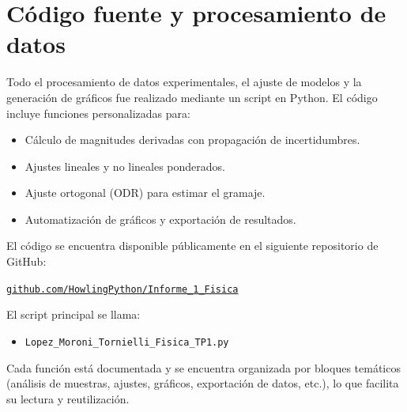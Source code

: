 \documentclass[12pt,a4]{article}
\begin{document}
\appendix
\section{Código fuente y procesamiento de datos}

Todo el procesamiento de datos experimentales, el ajuste de modelos y la generación de gráficos fue realizado mediante un script en Python. El código incluye funciones personalizadas para:

\begin{itemize}
    \item Cálculo de magnitudes derivadas con propagación de incertidumbres.
    \item Ajustes lineales y no lineales ponderados.
    \item Ajuste ortogonal (ODR) para estimar el gramaje.
    \item Automatización de gráficos y exportación de resultados.
\end{itemize}

El código se encuentra disponible públicamente en el siguiente repositorio de GitHub:

\begin{center}
\href{https://github.com/HowlingPython/Informe_1_Fisica.git}{\texttt{github.com/HowlingPython/Informe\_1\_Fisica}}
\end{center}

El script principal se llama:

\begin{itemize}
    \item \texttt{Lopez\_Moroni\_Tornielli\_Fisica\_TP1.py}
\end{itemize}

Cada función está documentada y se encuentra organizada por bloques temáticos (análisis de muestras, ajustes, gráficos, exportación de datos, etc.), lo que facilita su lectura y reutilización.

\printbibliography
\end{document}
